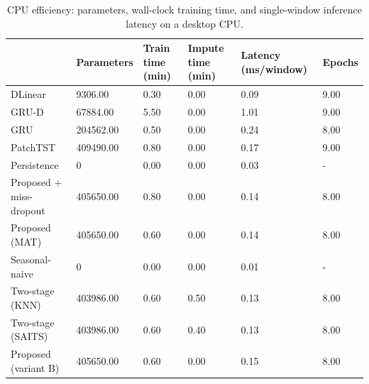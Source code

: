\begin{table}
\caption{CPU efficiency: parameters, wall-clock training time, and single-window inference latency on a desktop CPU.}
\label{tab:efficiency}
\begin{tabular}{llllll}
\toprule
 & Parameters & Train time (min) & Impute time (min) & Latency (ms/window) & Epochs \\
\midrule
DLinear & 9306.00 & 0.30 & 0.00 & 0.09 & 9.00 \\
GRU-D & 67884.00 & 5.50 & 0.00 & 1.01 & 9.00 \\
GRU & 204562.00 & 0.50 & 0.00 & 0.24 & 8.00 \\
PatchTST & 409490.00 & 0.80 & 0.00 & 0.17 & 9.00 \\
Persistence & 0 & 0.00 & 0.00 & 0.03 & - \\
Proposed + miss-dropout & 405650.00 & 0.80 & 0.00 & 0.14 & 8.00 \\
Proposed (MAT) & 405650.00 & 0.60 & 0.00 & 0.14 & 8.00 \\
Seasonal-naive & 0 & 0.00 & 0.00 & 0.01 & - \\
Two-stage (KNN) & 403986.00 & 0.60 & 0.50 & 0.13 & 8.00 \\
Two-stage (SAITS) & 403986.00 & 0.60 & 0.40 & 0.13 & 8.00 \\
Proposed (variant B) & 405650.00 & 0.60 & 0.00 & 0.15 & 8.00 \\
\bottomrule
\end{tabular}
\end{table}
